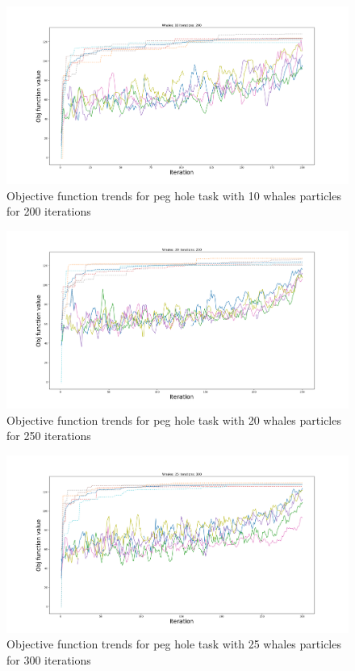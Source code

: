 \documentclass[twocolumn]{svjour3}
\begin{document}
\begin{figure}[h]
    	\includegraphics[width=1\linewidth]{Figure_6}
        \caption{Objective function trends for peg hole task with 10 whales particles for 200 iterations}\label{fig:sfig1}
\end{figure}
\begin{figure}[h]
		\includegraphics[width=1\linewidth]{Figure_5}
        \caption{Objective function trends for peg hole task with 20 whales particles for 250 iterations}\label{fig:sfig2}
\end{figure}
\begin{figure}[h]
		\includegraphics[width=1\linewidth]{Figure_4}
		\caption{Objective function trends for peg hole task with 25 whales particles for 300 iterations}\label{fig:sfig3}
\end{figure}
\end{document}
